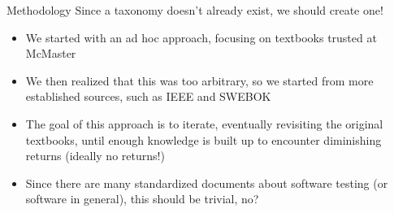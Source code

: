 \documentclass[22pt]{beamer}
\begin{document}
\begin{frame}[fragile]
\begin{textblock}{7.25}
        \begin{block}{\fontsize{37}{20}\selectfont Methodology}
            Since a taxonomy doesn't already exist, we should create one!
            \begin{itemize}
                \item We started with an ad hoc approach, focusing on
                      textbooks trusted at McMaster
                \item We then realized that this was too arbitrary, so
                      we started from more established sources, such as
                      IEEE and SWEBOK
                \item The goal of this approach is to iterate,
                      eventually revisiting the original textbooks,
                      until enough knowledge is built up to encounter
                      diminishing returns (ideally no returns!)
                \item Since there are many standardized documents about software
                      testing (or software in general), this should be trivial, no?
            \end{itemize}
            \vspace{5mm}
        \end{block}


\end{textblock}
\end{frame}
\end{document}
